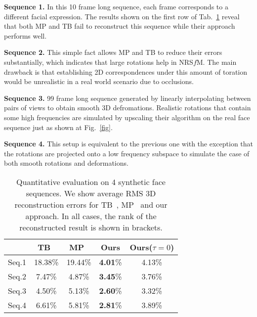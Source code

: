 \documentclass[10pt,twocolumn,letterpaper]{article}
\begin{document}
{\bf Sequence 1.} In this 10 frame long sequence, each frame corresponds to a different facial expression. The results shown on the first row of Tab.~\ref{tab} reveal that both MP and TB fail to reconstruct this sequence while their approach performs well.

{\bf Sequence 2.} This simple fact allows MP and TB to reduce their errors substantially, which indicates that large rotations help in NRS$f$M. The main drawback is that establishing 2D correspondences under this amount of toration would be unrealistic in a real world scenario due to occlusions.

{\bf Sequence 3.} 99 frame long sequence generated by linearly interpolating between pairs of views to obtain smooth 3D defromations. Realistic rotations that contain some high frequencies are simulated by upscaling their algorithm on the real face sequence just as shown at Fig.~\ref{fig}.

{\bf Sequence 4.} This setup is equivalent to the previous one with the exception that the rotations are projected onto a low frequency subspace to simulate the case of both smooth rotations and deformations.

\begin{table}
\begin{center}
\begin{tabular}{|c||c|c|c|c|}
  \hline
   & TB~\cite{Trajectory} & MP~\cite{Optimal} & Ours & Ours($\tau=0$) \\
   \hline
   Seq.1 & 18.38\% & 19.44\% & {\bf 4.01}\% &  4.13\% \\
   Seq.2 & 7.47\% & 4.87\% & {\bf 3.45}\% & 3.76\% \\
   Seq.3 & 4.50\% & 5.13\% & {\bf 2.60}\% & 3.32\% \\
   Seq.4 & 6.61\% & 5.81\% & {\bf 2.81}\% & 3.89\% \\
   \hline
\end{tabular}
\end{center}
\caption{Quantitative evaluation on 4 synthetic face sequences. We show average RMS 3D reconstruction errors for TB~\cite{Trajectory}, MP~\cite{Optimal} and our approach. In all cases, the rank of the reconstructed result is shown in brackets.}
\label{tab}
\end{table}


{\small


}
\end{document}
